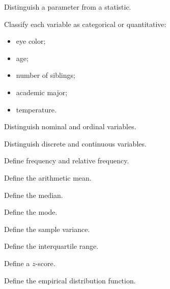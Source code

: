 \begin{exercise}[1]
Distinguish a parameter from a statistic.
\end{exercise}

\begin{exercise}[1]
Classify each variable as categorical or quantitative:
\begin{itemize}
    \item eye color;
    \item age;
    \item number of siblings;
    \item academic major;
    \item temperature.
\end{itemize}
\end{exercise}

\begin{exercise}[1]
Distinguish nominal and ordinal variables.
\end{exercise}

\begin{exercise}[1]
Distinguish discrete and continuous variables.
\end{exercise}

\begin{exercise}[1]
Define frequency and relative frequency.
\end{exercise}

\begin{exercise}[1]
Define the arithmetic mean.
\end{exercise}

\begin{exercise}[1]
Define the median.
\end{exercise}

\begin{exercise}[1]
Define the mode.
\end{exercise}

\begin{exercise}[1]
Define the sample variance.
\end{exercise}

\begin{exercise}[1]
Define the interquartile range.
\end{exercise}

\begin{exercise}[1]
Define a \(z\)-score.
\end{exercise}

\begin{exercise}[1]
Define the empirical distribution function.
\end{exercise}

